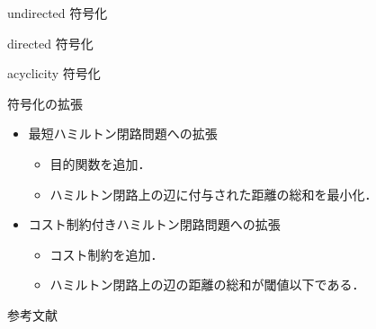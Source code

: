 \documentclass[dvipdfmx,11pt]{beamer}
\begin{document}
\begin{frame}[noframenumbering]{\textsf{undirected} 符号化}



\end{frame}

\begin{frame}[noframenumbering]{\textsf{directed} 符号化}



\end{frame}

\begin{frame}[noframenumbering]{\textsf{acyclicity} 符号化}



\end{frame}

\begin{frame}[noframenumbering]{符号化の拡張}
  






  \begin{itemize}
  \item 最短ハミルトン閉路問題への拡張
    \begin{itemize}
    \item 目的関数を追加．
    \item ハミルトン閉路上の辺に付与された距離の総和を最小化．
    \end{itemize}
  \item コスト制約付きハミルトン閉路問題への拡張
    \begin{itemize}
    \item コスト制約を追加．
    \item ハミルトン閉路上の辺の距離の総和が閾値以下である．
    \end{itemize}
  \end{itemize}
\end{frame}

\begin{frame}[noframenumbering]{参考文献}
\end{frame}
\end{document}
